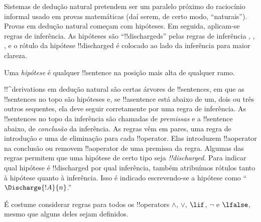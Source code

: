\documentclass[../../../include/open-logic-section]{subfiles}
\begin{document}
      {}
      {}


\begin{explain}
Sistemas de dedução natural pretendem ser um paralelo próximo do raciocínio
informal usado em provas matemáticas (daí serem, de certo modo,
``naturais''). Provas em dedução natural começam com hipóteses.
Em seguida, aplicam-se regras de inferência. As hipóteses são ``!!{discharged}s''
pelas regras de inferência \Intro{\lnot}, \Intro{\lif}, , e o rótulo da
hipótese !!{discharged} é colocado ao lado da inferência para maior
clareza.
\end{explain}

\begin{defn}[Hipótese]
Uma \emph{hipótese} é qualquer !!{sentence}
na posição mais alta de qualquer ramo.
\end{defn}

!!^{derivation}s em dedução natural são certas árvores de
!!{sentence}s, em que as !!{sentence}s no topo são hipóteses e, se
!!a{sentence} está abaixo de um, dois ou três outros sequentes, ela deve
seguir corretamente por uma regra de inferência. As !!{sentence}s no topo
da inferência são chamadas de \emph{premissas} e a !!{sentence}
abaixo, de \emph{conclusão} da inferência.  As regras vêm em
pares, uma regra de introdução e uma de eliminação para cada
!!{operator}. Elas introduzem !!a{operator} na conclusão ou
removem !!a{operator} de uma premissa da regra.  Algumas das regras
permitem que uma hipótese de certo tipo seja \emph{!!{discharged}}. Para
indicar qual hipótese é !!{discharged} por qual inferência, também
atribuímos rótulos tanto à hipótese quanto à inferência.  Isso é
indicado escrevendo-se a hipótese como ``$\Discharge{!A}{n}$.''


%
	{É costume considerar regras para todos os !!{operator}s $\land$, $\lor$, $\lif$, $\lnot$ e $\lfalse$, mesmo que alguns deles sejam definidos.}
\end{document}
